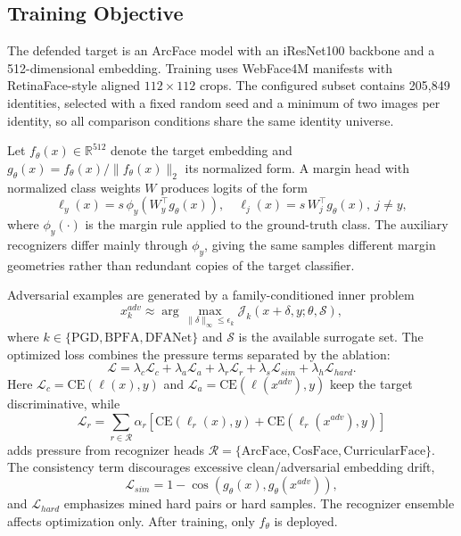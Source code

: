 \documentclass[conference]{IEEEtran}
\begin{document}
\subsection{Training Objective}
The defended target is an ArcFace model with an iResNet100 backbone and a
512-dimensional embedding. Training uses WebFace4M manifests with
RetinaFace-style aligned $112{\times}112$ crops. The configured subset contains
205,849 identities, selected with a fixed random seed and a minimum of two
images per identity, so all comparison conditions share the same identity
universe.

Let $f_{\theta}(x)\in\mathbb{R}^{512}$ denote the target embedding and
$g_{\theta}(x)=f_{\theta}(x)/\|f_{\theta}(x)\|_2$ its normalized form. A
margin head with normalized class weights $W$ produces logits of the form
\begin{equation}
    \ell_y(x)=s\,\phi_y(W_y^\top g_{\theta}(x)),\quad
    \ell_j(x)=s\,W_j^\top g_{\theta}(x),\ j\neq y ,
\end{equation}
where $\phi_y(\cdot)$ is the margin rule applied to the ground-truth class.
The auxiliary recognizers differ mainly through $\phi_y$, giving the same
samples different margin geometries rather than redundant copies of the target
classifier.

Adversarial examples are generated by a family-conditioned inner problem
\begin{equation}
    x^{adv}_{k} \approx
    \arg\max_{\|\delta\|_{\infty}\leq\epsilon_k}
    \mathcal{J}_{k}(x+\delta,y;\theta,\mathcal{S}),
\end{equation}
where $k\in\{\mathrm{PGD},\mathrm{BPFA},\mathrm{DFANet}\}$ and $\mathcal{S}$
is the available surrogate set. The optimized loss combines the pressure
terms separated by the ablation:
\begin{equation}
\mathcal{L} =
\lambda_c\mathcal{L}_{c} +
\lambda_a\mathcal{L}_{a} +
\lambda_r\mathcal{L}_{r} +
\lambda_s\mathcal{L}_{sim} +
\lambda_h\mathcal{L}_{hard}.
\end{equation}
Here $\mathcal{L}_{c}=\mathrm{CE}(\ell(x),y)$ and
$\mathcal{L}_{a}=\mathrm{CE}(\ell(x^{adv}),y)$ keep the target discriminative,
while
\begin{equation}
    \mathcal{L}_{r}=\sum_{r\in\mathcal{R}}\alpha_r
    \left[\mathrm{CE}(\ell_r(x),y)+\mathrm{CE}(\ell_r(x^{adv}),y)\right]
\end{equation}
adds pressure from recognizer heads
$\mathcal{R}=\{\mathrm{ArcFace},\mathrm{CosFace},\mathrm{CurricularFace}\}$.
The consistency term discourages excessive clean/adversarial embedding drift,
\begin{equation}
    \mathcal{L}_{sim}=1-\cos(g_{\theta}(x),g_{\theta}(x^{adv})),
\end{equation}
and $\mathcal{L}_{hard}$ emphasizes mined hard pairs or hard samples. The
recognizer ensemble affects optimization only. After training, only
$f_{\theta}$ is deployed.
\end{document}
